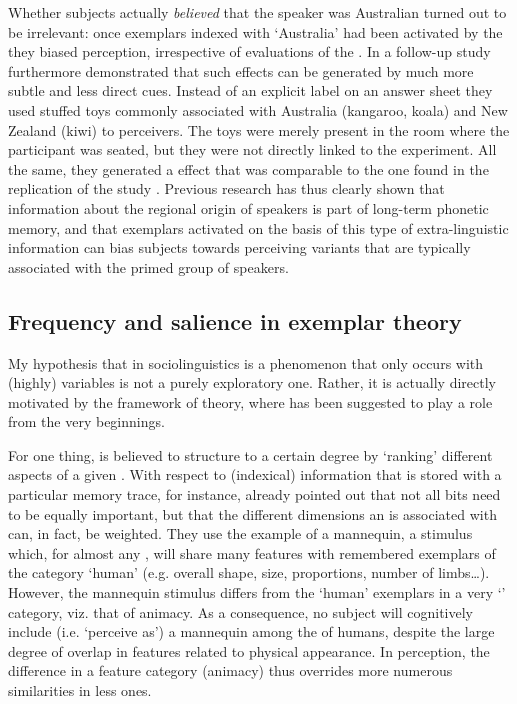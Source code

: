 Whether subjects actually \emph{believed} that the speaker was Australian turned out to be irrelevant: once exemplars indexed with `Australia' had been activated by the  they biased perception, irrespective of  evaluations of the  \parencite[cf.][374]{hayetal2006a}.
In a follow-up study \textcite{haydrager2010} furthermore demonstrated that such  effects can be generated by much more subtle and less direct cues.
Instead of an explicit label on an answer sheet they used stuffed toys commonly associated with Australia (kangaroo, koala) and New Zealand (kiwi) to  perceivers.
The toys were merely present in the room where the participant was seated, but they were not directly linked to the experiment.
All the same, they generated a  effect that was comparable to the one found in the replication of the \citeauthor{niedzielski1999} study \parencite[cf.][871--872 and 874--875]{haydrager2010}.
Previous research has thus clearly shown that information about the regional origin of speakers is part of long-term phonetic memory, and that exemplars activated on the basis of this type of extra-linguistic information can bias subjects towards perceiving variants that are typically associated with the primed group of speakers.

		\subsection{Frequency and salience in exemplar theory}
		\label{sec.sal.exemplar.freq}
		
My hypothesis that   in sociolinguistics is a phenomenon that only occurs with (highly)  variables is not a purely exploratory one.
Rather, it is actually directly motivated by the framework of  theory, where  has been suggested to play a role from the very beginnings.

For one thing,  is believed to structure  to a certain degree by `ranking' different aspects of a given .
With respect to (indexical) information that is stored with a particular memory trace, for instance, \textcite[cf.][210--212]{medinschaffer1978} already pointed out that not all bits need to be equally important, but that the different dimensions an  is associated with can, in fact, be weighted.
They use the example of a mannequin, a stimulus which, for almost any , will share many features with remembered exemplars of the category `human' (e.g. overall shape, size, proportions, number of limbs\ldots).
However, the mannequin stimulus differs from the `human' exemplars in a very `' category, viz. that of animacy.
As a consequence, no subject will cognitively include (i.e. `perceive as') a mannequin among the  of humans, despite the large degree of overlap in features related to physical appearance.
In perception, the difference in a  feature category (animacy) thus overrides more numerous similarities in less  ones.

